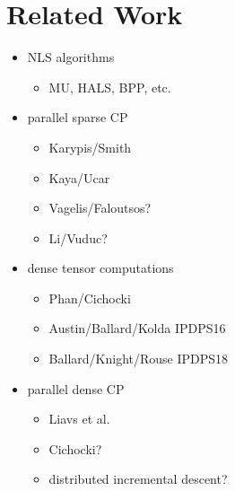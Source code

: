 
\section{Related Work} 
\label{sec:survey}

\begin{itemize}
	\item NLS algorithms
	\begin{itemize}
		\item MU, HALS, BPP, etc.
	\end{itemize}
	\item parallel sparse CP
	\begin{itemize}
		\item Karypis/Smith
		\item Kaya/Ucar
		\item Vagelis/Faloutsos?
		\item Li/Vuduc?
	\end{itemize}
	\item dense tensor computations
	\begin{itemize}
		\item Phan/Cichocki
		\item Austin/Ballard/Kolda IPDPS16
		\item Ballard/Knight/Rouse IPDPS18
	\end{itemize}
	\item parallel dense CP
	\begin{itemize}
		\item Liavs et al.
		\item Cichocki?
		\item distributed incremental descent?
	\end{itemize} 
\end{itemize}